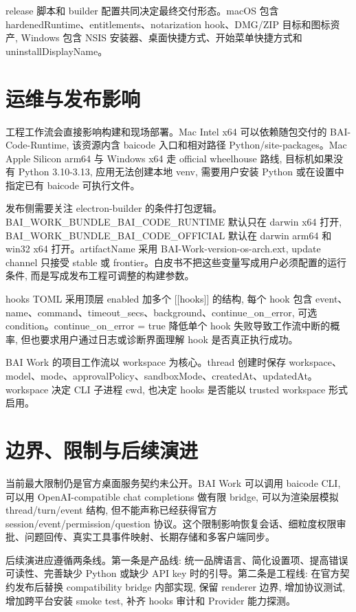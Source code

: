release 脚本和 builder 配置共同决定最终交付形态。macOS 包含 hardenedRuntime、entitlements、notarization hook、DMG/ZIP 目标和图标资产, Windows 包含 NSIS 安装器、桌面快捷方式、开始菜单快捷方式和 uninstallDisplayName。

\section{运维与发布影响}
工程工作流会直接影响构建和现场部署。Mac Intel x64 可以依赖随包交付的 BAI-Code-Runtime, 该资源内含 baicode 入口和相对路径 Python/site-packages。Mac Apple Silicon arm64 与 Windows x64 走 official wheelhouse 路线, 目标机如果没有 Python 3.10-3.13, 应用无法创建本地 venv, 需要用户安装 Python 或在设置中指定已有 baicode 可执行文件。

发布侧需要关注 electron-builder 的条件打包逻辑。BAI\_WORK\_BUNDLE\_BAI\_CODE\_RUNTIME 默认只在 darwin x64 打开, BAI\_WORK\_BUNDLE\_BAI\_CODE\_OFFICIAL 默认在 darwin arm64 和 win32 x64 打开。artifactName 采用 BAI-Work-{version}-{os}-{arch}.{ext}, update channel 只接受 stable 或 frontier。白皮书不把这些变量写成用户必须配置的运行条件, 而是写成发布工程可调整的构建参数。

hooks TOML 采用顶层 enabled 加多个 [[hooks]] 的结构, 每个 hook 包含 event、name、command、timeout\_secs、background、continue\_on\_error, 可选 condition。continue\_on\_error = true 降低单个 hook 失败导致工作流中断的概率, 但也要求用户通过日志或诊断界面理解 hook 是否真正执行成功。

BAI Work 的项目工作流以 workspace 为核心。thread 创建时保存 workspace、model、mode、approvalPolicy、sandboxMode、createdAt、updatedAt。workspace 决定 CLI 子进程 cwd, 也决定 hooks 是否能以 trusted workspace 形式启用。

\section{边界、限制与后续演进}
当前最大限制仍是官方桌面服务契约未公开。BAI Work 可以调用 baicode CLI, 可以用 OpenAI-compatible chat completions 做有限 bridge, 可以为渲染层模拟 thread/turn/event 结构, 但不能声称已经获得官方 session/event/permission/question 协议。这个限制影响恢复会话、细粒度权限审批、问题回传、真实工具事件映射、长期存储和多客户端同步。

后续演进应遵循两条线。第一条是产品线: 统一品牌语言、简化设置项、提高错误可读性、完善缺少 Python 或缺少 API key 时的引导。第二条是工程线: 在官方契约发布后替换 compatibility bridge 内部实现, 保留 renderer 边界, 增加协议测试, 增加跨平台安装 smoke test, 补齐 hooks 审计和 Provider 能力探测。

